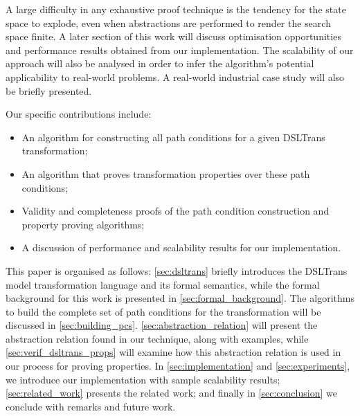 
A large difficulty in any exhaustive proof technique is the tendency for the
state space to explode, even when abstractions are performed to render the
search space finite.  A later section of this work will discuss optimisation
opportunities and performance results obtained from our implementation. The
scalability of our approach will also be analysed in order to infer the
algorithm's potential applicability to real-world problems. A real-world industrial case study will also be briefly presented.

Our specific contributions include:

\begin{itemize}
\item An algorithm for constructing all path conditions for a given DSLTrans transformation;
\item An algorithm that proves transformation properties over these path conditions;
\item Validity and completeness proofs of the path condition construction and property proving algorithms;
\item A discussion of performance and scalability results for our implementation.
\end{itemize}

This paper is organised as follows: \cref{sec:dsltrans} briefly introduces
the DSLTrans model transformation language and its formal semantics, while the formal background for this work is presented in \cref{sec:formal_background}. The algorithms to build the complete set of path
conditions for the transformation will be discussed in
\cref{sec:building_pcs}. \cref{sec:abstraction_relation} will present the abstraction relation found in our technique, along with examples, while \cref{sec:verif_dsltrans_props} will examine how this abstraction relation is used in our process for proving properties. In \cref{sec:implementation} and \cref{sec:experiments}, we introduce our implementation with sample scalability results; \cref{sec:related_work} presents the related work;
and finally in \cref{sec:conclusion} we conclude with remarks and future
work.

